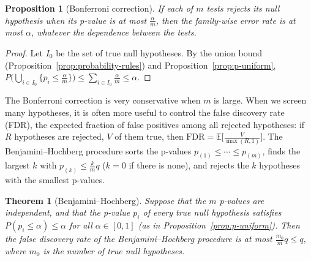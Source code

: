 \documentclass[11pt]{article}
\newcommand{\E}{\mathbb{E}}
\theoremstyle{definition}
\theoremstyle{plain}
\newtheorem{theorem}[definition]{Theorem}
\newtheorem{proposition}[definition]{Proposition}
\theoremstyle{remark}
\begin{document}
\begin{proposition}[Bonferroni correction]\label{prop:bonferroni}
    If each of $m$ tests rejects its null hypothesis when its p-value is at most $\frac{\alpha}{m}$, then the family-wise error rate is at most $\alpha$, whatever the dependence between the tests.
\end{proposition}

\begin{proof}
    Let $I_0$ be the set of true null hypotheses. By the union bound (Proposition~\ref{prop:probability-rules}) and Proposition~\ref{prop:p-uniform}, $P\big(\bigcup_{i \in I_0}\{p_i \leq \frac{\alpha}{m}\}\big) \leq \sum_{i \in I_0} \frac{\alpha}{m} \leq \alpha$.
\end{proof}

The Bonferroni correction is very conservative when $m$ is large. When we screen many hypotheses, it is often more useful to control the false discovery rate (FDR), the expected fraction of false positives among all rejected hypotheses: if $R$ hypotheses are rejected, $V$ of them true, then $\mathrm{FDR} = \E\big[\frac{V}{\max(R, 1)}\big]$. The Benjamini--Hochberg procedure sorts the p-values $p_{(1)} \leq \cdots \leq p_{(m)}$, finds the largest $k$ with $p_{(k)} \leq \frac{k}{m}q$ ($k = 0$ if there is none), and rejects the $k$ hypotheses with the smallest p-values.

\begin{theorem}[Benjamini--Hochberg]\label{thm:bh}
    Suppose that the $m$ p-values are independent, and that the p-value $p_i$ of every true null hypothesis satisfies $P(p_i \leq \alpha) \leq \alpha$ for all $\alpha \in [0, 1]$ (as in Proposition~\ref{prop:p-uniform}). Then the false discovery rate of the Benjamini--Hochberg procedure is at most $\frac{m_0}{m}q \leq q$, where $m_0$ is the number of true null hypotheses.
\end{theorem}
\end{document}
